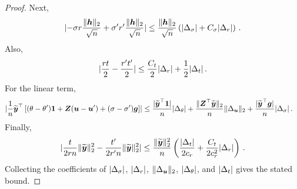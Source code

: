 \documentclass{article}
\makeatletter
\theoremstyle{definition}
\newcommand{\vnorm}[1]{%
	\ensuremath{%
		\if@display
		\left\| #1 \right\|
		\else
		\| #1 \|
		\fi
	}%
}
\newcommand{\abs}[1]{%
	\ensuremath{%
		\if@display
		\left| #1 \right|
		\else
		\lvert #1 \rvert
		\fi
	}%
}
\newcommand*{\bb}{\boldsymbol}
\def\bu{\bb{u}}
\def\bh{\bb{h}}
\def\bg{\bb{g}}
\def\bYtil{\widetilde{\bb{y}}}
\makeatother
\begin{document}
\begin{bibunit}
\begin{proof}
	Next,
	$$
		\abs{
			-\sigma r\frac{\vnorm{\bh}_2}{\sqrt n}
			+
			\sigma'r'\frac{\vnorm{\bh}_2}{\sqrt n}
		}
		\leq
		\frac{\vnorm{\bh}_2}{\sqrt n}
		\left(
			\abs{\Delta_\sigma}
			+
			C_\sigma\abs{\Delta_r}
		\right)\,.
	$$
	Also,
	$$
		\abs{
			\frac{rt}{2}
			-
			\frac{r't'}{2}
		}
		\leq
		\frac{C_t}{2}\abs{\Delta_r}
		+
		\frac12\abs{\Delta_t}\,.
	$$
	For the linear term,
	$$
		\begin{aligned}
		&\abs{
			\frac1n
			\bYtil^\top
			\left[
				(\theta-\theta')\bb1
				+
				\bb Z(\bu-\bu')
				+
				(\sigma-\sigma')\bg
			\right]
		}\leq
		\frac{\abs{\bYtil^\top\bb1}}{n}\abs{\Delta_\theta}
		+
		\frac{\vnorm{\bb Z^\top\bYtil}_2}{n}\vnorm{\Delta_{\bu}}_2
		+
		\frac{\abs{\bYtil^\top\bg}}{n}\abs{\Delta_\sigma}\,.
		\end{aligned}
	$$
	Finally,
	$$
		\abs{
			\frac{t}{2rn}\vnorm{\bYtil}_2^2
			-
			\frac{t'}{2r'n}\vnorm{\bYtil}_2^2
		}
		\leq
		\frac{\vnorm{\bYtil}_2^2}{n}
		\left(
			\frac{\abs{\Delta_t}}{2c_r}
			+
			\frac{C_t}{2c_r^2}\abs{\Delta_r}
		\right)\,.
	$$
	Collecting the coefficients of $\abs{\Delta_\sigma}$, $\abs{\Delta_r}$, $\vnorm{\Delta_{\bu}}_2$, $\abs{\Delta_\theta}$, and $\abs{\Delta_t}$ gives the stated bound.
\end{proof}


\end{bibunit}
\end{document}
